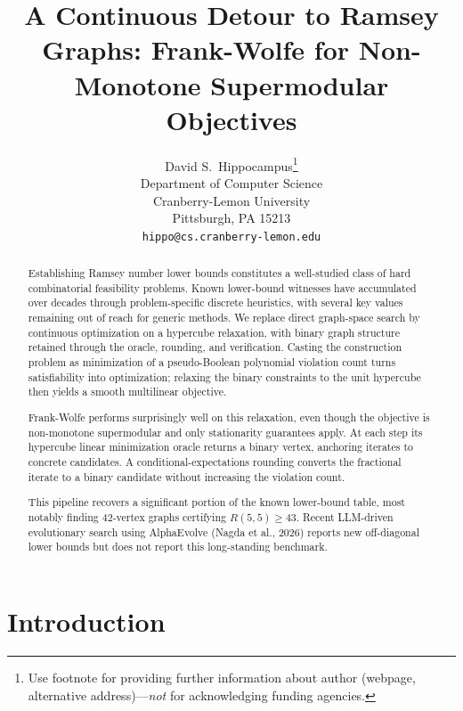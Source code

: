 \documentclass{article}
\title{A Continuous Detour to Ramsey Graphs: Frank-Wolfe for Non-Monotone Supermodular Objectives}
\author{%
  David S.~Hippocampus\thanks{Use footnote for providing further information
    about author (webpage, alternative address)---\emph{not} for acknowledging
    funding agencies.} \\
  Department of Computer Science\\
  Cranberry-Lemon University\\
  Pittsburgh, PA 15213 \\
  \texttt{hippo@cs.cranberry-lemon.edu} \\
}
\begin{document}
\maketitle


\begin{abstract}
    Establishing Ramsey number lower bounds constitutes a well-studied class of hard combinatorial feasibility problems. Known lower-bound witnesses have accumulated over decades through problem-specific discrete heuristics, with several key values remaining out of reach for generic methods. We replace direct graph-space search by continuous optimization on a hypercube relaxation, with binary graph structure retained through the oracle, rounding, and verification. Casting the construction problem as minimization of a pseudo-Boolean polynomial violation count turns satisfiability into optimization; relaxing the binary constraints to the unit hypercube then yields a smooth multilinear objective.

    Frank-Wolfe performs surprisingly well on this relaxation, even though the objective is non-monotone supermodular and only stationarity guarantees apply. At each step its hypercube linear minimization oracle returns a binary vertex, anchoring iterates to concrete candidates. A conditional-expectations rounding converts the fractional iterate to a binary candidate without increasing the violation count.

    This pipeline recovers a significant portion of the known lower-bound table, most notably finding $42$-vertex graphs certifying $R(5,5) \geq 43$. Recent LLM-driven evolutionary search using AlphaEvolve (Nagda et al., 2026) reports new off-diagonal lower bounds but does not report this long-standing benchmark.
\end{abstract}



\section{Introduction}
\end{document}
